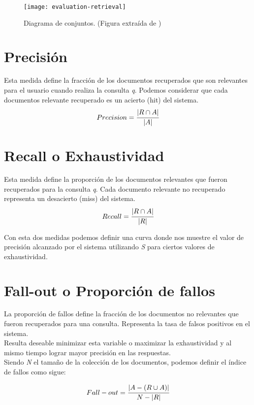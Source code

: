 	\begin{figure}[h]
		\texttt{[image: evaluation-retrieval]}
		\centering
		\caption{Diagrama de conjuntos. (Figura extraída de \cite{baeza2011})}
	\end{figure}

\section{Precisión}
Esta medida define la fracción de los documentos recuperados que son relevantes para el usuario cuando realiza la consulta \textit{q}. Podemos considerar que cada documentos relevante recuperado es un acierto (hit) del sistema. \\

					\begin{equation}
						Precision = \cfrac{|R \cap A|}{|A|}
					\end{equation}
	
\section{Recall o Exhaustividad}
Esta medida define la proporción de los documentos relevantes que fueron recuperados para la consulta \textit{q}. Cada documento relevante no recuperado representa un desacierto (miss) del sistema. \\

					\begin{equation}
						Recall = \cfrac{|R \cap A|}{|R|}
					\end{equation}
					
Con esta dos medidas podemos definir una curva donde nos muestre el valor de precisión alcanzado por el sistema utilizando \textit{S} para ciertos valores de exhaustividad. \\
	
\section{Fall-out o Proporción de fallos}
La proporción de fallos define la fracción de los documentos no relevantes que fueron recuperados para una consulta. Representa la tasa de falsos positivos en el sistema.\\
Resulta deseable minimizar esta variable o maximizar la exhaustividad y al mismo tiempo lograr mayor precisión en las respuestas. \\
Siendo \textit{N} el tamaño de la colección de los documentos, podemos definir el índice de fallos como sigue:

					\begin{equation}
						Fall-out = \cfrac{|A - (R \cup A)|}{N - |R|}
					\end{equation}

